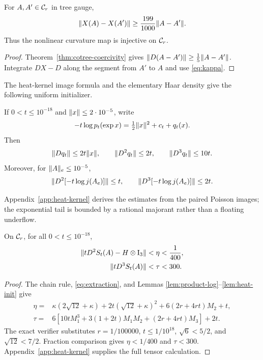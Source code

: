 \begin{corollary}\label{cor:injectivity}
For $A,A'\in\mathcal C_r$ in tree gauge,
\[
 \lVert X(A)-X(A')\rVert\ge\frac{199}{1000}\lVert A-A'\rVert.
\]
Thus the nonlinear curvature map is injective on $\mathcal C_r$.
\end{corollary}

\begin{proof}
Theorem~\ref{thm:cotree-coercivity} gives
$\lVert D(A-A')\rVert\ge\frac15\lVert A-A'\rVert$.  Integrate
$DX-D$ along the segment from $A'$ to $A$ and use \eqref{eq:kappa}.
\end{proof}

The heat-kernel image formula and the elementary Haar density give the
following uniform initializer.

\begin{lemma}\label{lem:heat-init}
If $0<t\le10^{-18}$ and $\lVert x\rVert\le2\cdot10^{-5}$, write
\[
 -t\log p_t(\exp x)=\tfrac12\lVert x\rVert^2+c_t+q_t(x).
\]
Then
\[
 \lVert Dq_t\rVert\le 2t\lVert x\rVert,\qquad
 \lVert D^2q_t\rVert\le2t,\qquad \lVert D^3q_t\rVert\le10t.
\]
Moreover, for $\lVert A\rVert_e\le10^{-5}$,
\[
 \lVert D^2[-t\log j(A_e)]\rVert\le t,\qquad
 \lVert D^3[-t\log j(A_e)]\rVert\le2t.
\]
\end{lemma}

Appendix~\ref{app:heat-kernel} derives the estimates from the paired Poisson
images; the exponential tail is bounded by a rational majorant rather than a
floating underflow.

\begin{proposition}\label{prop:action-norm}
On $\mathcal C_r$, for all $0<t\le10^{-18}$,
\begin{align}
 \lVert tD^2S_t(A)-H\otimes\mathrm I_3\rVert&<\eta<\frac1{400},\label{eq:eta-bound}\\
 \lVert tD^3S_t(A)\rVert&<\tau<300.\label{eq:tau-bound}
\end{align}
\end{proposition}

\begin{proof}
The chain rule, \eqref{eq:extraction}, and Lemmas
\ref{lem:product-log}--\ref{lem:heat-init} give
\begin{align*}
\eta={}&\kappa(2\sqrt{12}+\kappa)
 +2t(\sqrt{12}+\kappa)^2
 +6(2r+4rt)M_2+t,\\
\tau={}&6\left[10tM_1^3+3(1+2t)M_1M_2+(2r+4rt)M_3\right]+2t.
\end{align*}
The exact verifier substitutes $r=1/100000$, $t\le1/10^{18}$,
$\sqrt6<5/2$, and $\sqrt{12}<7/2$.  Fraction comparison gives
$\eta<1/400$ and $\tau<300$.  Appendix~\ref{app:heat-kernel} supplies the
full tensor calculation.
\end{proof}
